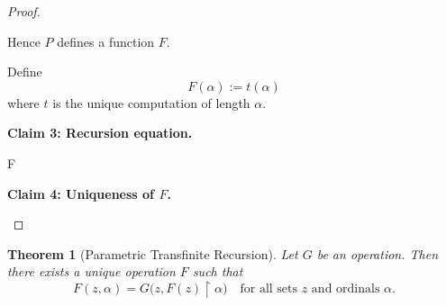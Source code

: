 \documentclass[10pt,a4paper]{book}
\newtheorem{theorem}{Theorem}[section]
\begin{document}
\begin{proof}
\begin{fitchproof}[arrayenv=tabular]
    \end{fitchproof}

    Hence $P$ defines a function $F$.

    \medskip

    Define
    \[
        F(\alpha):=t(\alpha)
    \]
    where $t$ is the unique computation of length $\alpha$.

    \textbf{Claim 3: Recursion equation.}

    \begin{fitchproof}[arrayenv=tabular]

         
         
         F{}

    \end{fitchproof}

    \textbf{Claim 4: Uniqueness of $F$.}

    \begin{fitchproof}[arrayenv=tabular]

         
         

    \end{fitchproof}

\end{proof}

\begin{theorem}[Parametric Transfinite Recursion]
    Let $G$ be an operation. Then there exists a unique operation $F$ such that
    \[
        F(z,\alpha)=G\bigl(z, F(z)\upharpoonright \alpha\bigr)
        \quad \text{for all sets } z \text{ and ordinals } \alpha.
    \]
\end{theorem}
\end{document}
